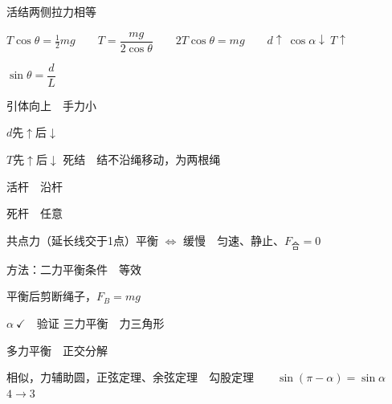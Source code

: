 
活结两侧拉力相等


$T\cos\theta=\frac12 mg$　　$T=\dfrac{mg}{2\cos\theta}$　　$2T\cos\theta=mg$　　$d\uparrow\ \cos\alpha\downarrow\ T\uparrow$ %

$\sin\theta=\dfrac{d}{L}$


引体向上　手力小

$d$先$\uparrow$后$\downarrow$

$T$先$\uparrow$后$\downarrow$
死结　结不沿绳移动，为两根绳

活杆　沿杆

死杆　任意

共点力（延长线交于1点）平衡 $\Leftrightarrow$ 缓慢　匀速、静止、$F_{\text{合}}=0$ %

方法：二力平衡条件　等效

平衡后剪断绳子，$F_B=mg$

$\alpha\ \checkmark$　验证
三力平衡　力三角形

多力平衡　正交分解

相似，力辅助圆，正弦定理、余弦定理　勾股定理　　$\sin(\pi-\alpha)=\sin\alpha$
$4\to3$


